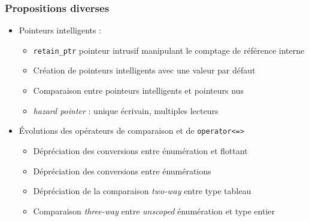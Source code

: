 \documentclass[C++.tex]{subfiles}
\begin{document}
\begin{frame}[fragile]
	\frametitle{Propositions diverses}
	\begin{itemize}
		\item Pointeurs intelligents :
		\begin{itemize}
			\item \lstinline|retain_ptr| pointeur intrusif manipulant le comptage de référence interne
			\item Création de pointeurs intelligents avec une valeur par défaut
			\item Comparaison entre pointeurs intelligents et pointeurs nus
			\item \textit{hazard pointer} : unique écrivain, multiples lecteurs
		\end{itemize}
		\item Évolutions des opérateurs de comparaison et de \lstinline|operator<=>|
		\begin{itemize}
			\item Dépréciation des conversions entre énumération et flottant
			\item Dépréciation des conversions entre énumérations
			\item Dépréciation de la comparaison \og \textit{two-way}\fg{} entre type tableau
			\item Comparaison \textit{three-way} entre \textit{unscoped} énumération et type entier


		\end{itemize}
	\end{itemize}
\end{frame}
\end{document}
